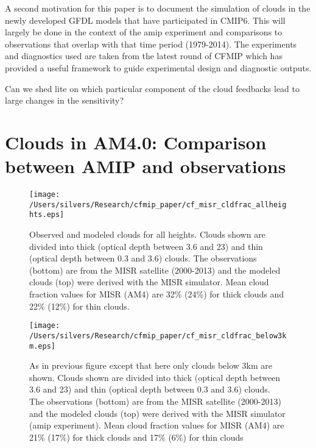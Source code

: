 \documentclass[11pt]{article}   	%
\begin{document}
A second motivation for this paper is to document the simulation of clouds in the newly developed GFDL models that 
have participated in CMIP6.  This will largely be done in the context of the amip experiment and comparisons to observations
that overlap with that time period (1979-2014).  The experiments and diagnostics used are taken from the latest 
round of CFMIP which has provided a useful framework to guide experimental design and diagnostic outputs.       

Can we shed lite on which particular component of the cloud feedbacks lead to large changes in the sensitivity?  

\section{Clouds in AM4.0: Comparison between AMIP and observations}



\begin{figure}
  \texttt{[image: /Users/silvers/Research/cfmip\_paper/cf\_misr\_cldfrac\_allheights.eps]}
  \caption{Observed and modeled clouds for all heights.  Clouds shown are divided into thick (optical depth between 3.6 and 23) 
  and thin (optical depth between 0.3 and 3.6) 
  clouds.  The observations (bottom) are from the MISR satellite (2000-2013) and the modeled clouds (top) were 
  derived with the MISR simulator.  Mean cloud fraction values for MISR 
  (AM4) are 32\% (24\%) for thick clouds and 22\% (12\%) for thin clouds.}
  \label{fig:misr}
\end{figure}

\begin{figure}
  \texttt{[image: /Users/silvers/Research/cfmip\_paper/cf\_misr\_cldfrac\_below3km.eps]}
  \caption{As in previous figure except that here only clouds below 3km are shown.  Clouds shown are divided into thick 
  (optical depth between 3.6 and 23) and thin (optical depth between 0.3 and 3.6) 
  clouds.  The observations (bottom) are from the MISR satellite (2000-2013) and the modeled clouds (top) were derived 
  with the MISR simulator (amip experiment). Mean cloud fraction values for MISR 
  (AM4) are 21\% (17\%) for thick clouds and 17\% (6\%) for thin clouds}
  \label{fig:calipso_sim_vs_mod}
\end{figure}
\end{document}
